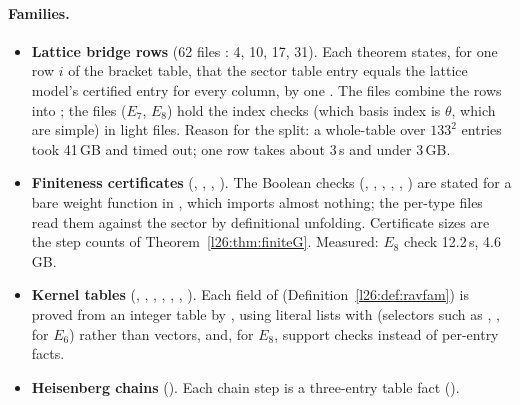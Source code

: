 \paragraph{Families.}
\begin{itemize}
\item \textbf{Lattice bridge rows} (62 files : 4, 10, 17, 31). Each theorem
   states, for one row $i$ of the bracket table, that the sector table entry equals the lattice model's
  certified entry for every column, by one . The  files combine the rows into
  ; the  files ($E_7$, $E_8$) hold the index checks (which basis index is $\theta$, which are simple)
  in light files. Reason for the split: a whole-table  over $133^2$ entries took 41\,GB and timed out; one row takes
  about 3\,s and under 3\,GB.
\item \textbf{Finiteness certificates} (, , ,
  ). The Boolean checks (, , , ,
  , ) are stated for a bare weight function in , which imports almost nothing;
  the per-type files read them against the sector by definitional unfolding. Certificate sizes are the step counts of
  Theorem~\ref{l26:thm:finiteG}. Measured: $E_8$ check 12.2\,s, 4.6\,GB.
\item \textbf{Kernel tables} (, , , ,
  , , ). Each field of 
  (Definition~\ref{l26:def:ravfam}) is proved from an integer table by , using literal lists with 
  (selectors such as , ,  for $E_6$) rather than \lean{![…]} vectors, and, for $E_8$,
  support checks instead of per-entry facts.
\item \textbf{Heisenberg chains} (). Each chain step is a three-entry table fact ().
\end{itemize}

